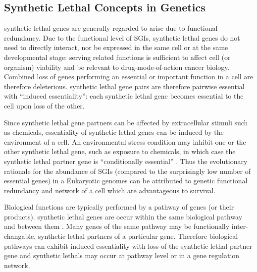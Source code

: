 \subsection{Synthetic Lethal Concepts in Genetics}

\Gls{synthetic lethal} genes are generally regarded to arise due to \gls{functional redundancy}. Due to the functional level of \glspl{SGI}, \gls{synthetic lethal} genes do not need to directly interact, nor be expressed in the same cell or at the same developmental stage: serving related functions is sufficient to affect cell (or organism) viability and be relevant to drug-mode-of-action cancer biology. Combined loss of genes performing an \gls{essential} or important function in a cell are therefore deleterious. \Gls{synthetic lethal} gene pairs are therefore pairwise \gls{essential} with ``\gls{induced essentiality}'': each \gls{synthetic lethal} gene becomes \gls{essential} to the cell upon loss of the other.

Since \gls{synthetic lethal} gene partners can be affected by extracellular stimuli such as chemicals, essentiality of \gls{synthetic lethal} genes can be induced by the environment of a cell.  An environmental stress condition may inhibit one or the other \gls{synthetic lethal} gene, such as exposure to chemicals, in which case the \gls{synthetic lethal} partner gene is ``conditionally essential'' \citep{Hillenmeyer2008}. Thus the evolutionary rationale for the abundance of \glspl{SGI} (compared to the surprisingly low number of \gls{essential} genes) in a Eukaryotic \glspl{genome} can be attributed to genetic \gls{functional redundancy} and network  of a cell which are advantageous to survival. 

Biological functions are typically performed by a \gls{pathway} of genes (or their products). \Gls{synthetic lethal} genes are occur within the same biological \gls{pathway} and between them \citep{Kelley2005, Boone2007, Costanzo2010}. Many genes of the same \gls{pathway} may be functionally inter-changable, \gls{synthetic lethal} partners of a particular gene. Therefore biological \glspl{pathway} can exhibit \gls{induced essentiality} with loss of the \gls{synthetic lethal} partner gene and \glspl{synthetic lethal} may occur at \gls{pathway} level or in a gene regulation network. 

